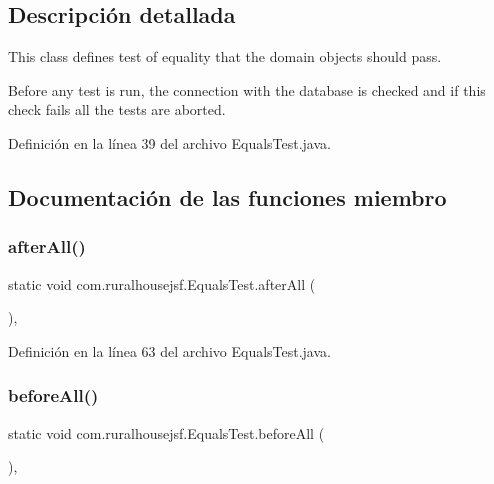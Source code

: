 \subsection{Descripción detallada}
This class defines test of equality that the domain objects should pass. 

Before any test is run, the connection with the database is checked and if this check fails all the tests are aborted. 

Definición en la línea 39 del archivo Equals\+Test.\+java.



\subsection{Documentación de las funciones miembro}
\mbox{\label{classcom_1_1ruralhousejsf_1_1_equals_test_afea5be25670fd0d03ebb37e737bda19b}} 
\subsubsection{\texorpdfstring{afterAll()}{afterAll()}}
{\footnotesize\ttfamily static void com.\+ruralhousejsf.\+Equals\+Test.\+after\+All (\begin{DoxyParamCaption}{ }\end{DoxyParamCaption})\hspace{0.3cm}{\ttfamily [static]}, {\ttfamily [package]}}



Definición en la línea 63 del archivo Equals\+Test.\+java.

\mbox{\label{classcom_1_1ruralhousejsf_1_1_equals_test_a114c96cfa4dbde48a42802952f8cd5b0}} 
\subsubsection{\texorpdfstring{beforeAll()}{beforeAll()}}
{\footnotesize\ttfamily static void com.\+ruralhousejsf.\+Equals\+Test.\+before\+All (\begin{DoxyParamCaption}{ }\end{DoxyParamCaption})\hspace{0.3cm}{\ttfamily [static]}, {\ttfamily [package]}}




